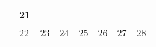{\begin{tabularx}{\linewidth}{|l!{\vrule width \myLenLineThicknessThick}*{7}{@{}X@{}|}}
       & 
    
      
      
        \begin{minipage}[t]{6mm}\centering{}21\end{minipage}
      
      
        \\  \hline 
      
    
  
  
  
  \hyperlink{week-2027-8}{} &
    
      
      
        \begin{minipage}[t]{6mm}\centering{}22\end{minipage}
      
       & 
    
      
      
        \begin{minipage}[t]{6mm}\centering{}23\end{minipage}
      
       & 
    
      
      
        \begin{minipage}[t]{6mm}\centering{}24\end{minipage}
      
       & 
    
      
      
        \begin{minipage}[t]{6mm}\centering{}25\end{minipage}
      
       & 
    
      
      
        \begin{minipage}[t]{6mm}\centering{}26\end{minipage}
      
       & 
    
      
      
        \begin{minipage}[t]{6mm}\centering{}27\end{minipage}
      
       & 
    
      
      
        \begin{minipage}[t]{6mm}\centering{}28\end{minipage}
      
      
        \\  \hline 
      
    
  
  
  \end{tabularx}
}
